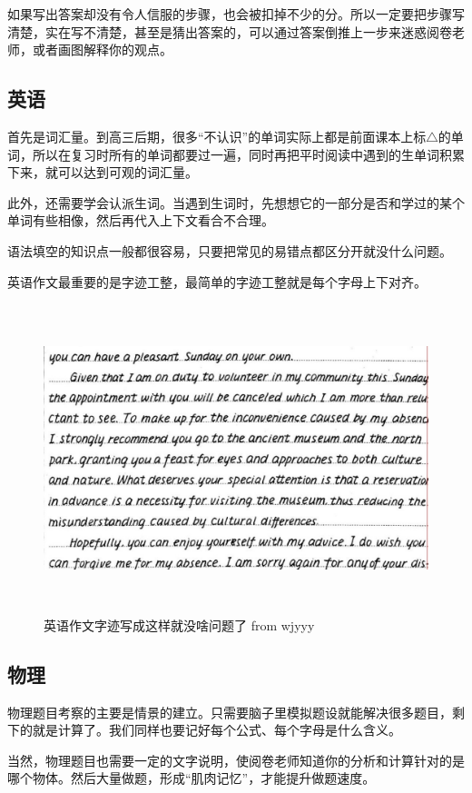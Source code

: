 \documentclass[UTF8,11pt,a4paper]{ctexart}
\begin{document}
			如果写出答案却没有令人信服的步骤，也会被扣掉不少的分。所以一定要把步骤写清楚，实在写不清楚，甚至是猜出答案的，可以通过答案倒推上一步来迷惑阅卷老师，或者画图解释你的观点。
		\subsection{英语}
			首先是词汇量。到高三后期，很多“不认识”的单词实际上都是前面课本上标$\triangle$的单词，所以在复习时所有的单词都要过一遍，同时再把平时阅读中遇到的生单词积累下来，就可以达到可观的词汇量。
			
			此外，还需要学会认派生词。当遇到生词时，先想想它的一部分是否和学过的某个单词有些相像，然后再代入上下文看合不合理。
			
			语法填空的知识点一般都很容易，只要把常见的易错点都区分开就没什么问题。
			
			英语作文最重要的是字迹工整，最简单的字迹工整就是每个字母上下对齐。
			
			\begin{figure}[h]
				\centering
				\includegraphics[width=16cm,height=9cm]{2.jpg}
				
				\caption{英语作文字迹写成这样就没啥问题了 from wjyyy}
			\end{figure}
		\subsection{物理}
			物理题目考察的主要是情景的建立。只需要脑子里模拟题设就能解决很多题目，剩下的就是计算了。我们同样也要记好每个公式、每个字母是什么含义。
			
			当然，物理题目也需要一定的文字说明，使阅卷老师知道你的分析和计算针对的是哪个物体。然后大量做题，形成“肌肉记忆”，才能提升做题速度。
\end{document}
